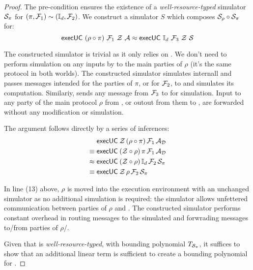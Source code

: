 \begin{proof}
The pre-condition ensures the existence of a \textit{well-resource-typed} simulator $\mathcal{S}_\pi$ for $(\pi, \mathcal{F}_1) \sim (\mathbb{I}_d, \mathcal{F}_2)$. 
We construct a simulator $S$ which composes $\mathcal{S}_\rho \circ \mathcal{S}_\pi$ for:
\[
	{\mathsf {execUC}}\ (\rho \circ \pi)\ \mathcal{F}_1\ \mathcal{Z}\ \mathcal{A} \approx {\mathsf {execUC}}\ \mathbb{I}_d\ \mathcal{F}_3\ \mathcal{Z}\ \mathcal{S}
\]	

The constructed simulator is trivial as it only relies on \Sim{\pi}.
We don't need to perform simulation on any inputs by \Environment to the main parties of $\rho$ (it's the same protocol in both worlds).
The constructed simulator \Simulator simulates \Sim{\pi} internall and passes messages intended for the parties of $\pi$, or for $\mathcal{F}_2$, to \Sim{\pi} and simulates its computation.
Similariy, \Simulator sends any message from $\mathcal{F}_3$ to \Sim{\pi} for simulation.  
Input to any party of the main protocol $\rho$ from \Environment, or outout from them to \Simulator, are forwarded without any modification or simulation.

The argument follows directly by a series of inferences:
\begin{align}
& {\mathsf {execUC}} \: \mathcal{Z} \, (\rho \circ \pi) \, \mathcal{F}_1 \, \mathcal{A}_\mathcal{D} \\
\equiv \; & {\mathsf {execUC}} \: (\mathcal{Z} \circ \rho) \, \pi \, \mathcal{F}_1 \, \mathcal{A}_\mathcal{D} \\
\approx \; & {\mathsf {execUC}} \: (\mathcal{Z} \circ \rho) \, \mathbb{I}_d \, \mathcal{F}_2 \, \mathcal{S}_{\pi} \\
\equiv \; & {\mathsf {execUC}} \: \mathcal{Z} \, \rho \, \mathcal{F}_2 \, \mathcal{S}_{\pi} 
\end{align}

In line (13) above, $\rho$ is moved into the execution environment with an unchanged simulator as no additional simulation is required: the simulator allows unfettered communication between parties of $\rho$ and \Environment.
The constructed simulator performs constant overhead in routing messages to the simulated \Sim{\pi} and forwrading messages to/from parties of $\rho$/\Environment. 

Given that \Sim{\pi} is \textit{well-resource-typed}, with bounding polynomial $T_{\mathcal{S}_{\pi}}$, it suffices to show that an additional linear term is sufficient to create a bounding polynomial for \Simulator.
\end{proof}

